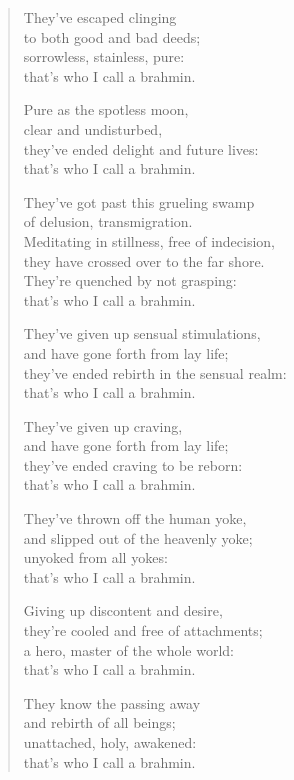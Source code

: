 \documentclass[12pt,openany]{book}%
\begin{document}
\begin{verse}
They’ve escaped clinging \\
to both good and bad deeds; \\
sorrowless, stainless, pure: \\
that’s who I call a brahmin. 

Pure as the spotless moon, \\
clear and undisturbed, \\
they’ve ended delight and future lives: \\
that’s who I call a brahmin. 

They’ve got past this grueling swamp \\
of delusion, transmigration. \\
Meditating in stillness, free of indecision, \\
they have crossed over to the far shore. \\
They’re quenched by not grasping: \\
that’s who I call a brahmin. 

They’ve given up sensual stimulations, \\
and have gone forth from lay life; \\
they’ve ended rebirth in the sensual realm: \\
that’s who I call a brahmin. 

They’ve given up craving, \\
and have gone forth from lay life; \\
they’ve ended craving to be reborn: \\
that’s who I call a brahmin. 

They’ve thrown off the human yoke, \\
and slipped out of the heavenly yoke; \\
unyoked from all yokes: \\
that’s who I call a brahmin. 

Giving up discontent and desire, \\
they’re cooled and free of attachments; \\
a hero, master of the whole world: \\
that’s who I call a brahmin. 

They know the passing away \\
and rebirth of all beings; \\
unattached, holy, awakened: \\
that’s who I call a brahmin. 


\end{verse}
\end{document}
